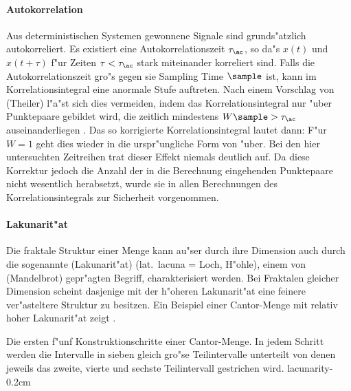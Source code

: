 \paragraph{Autokorrelation}
\label{corrdimtheiler}
Aus deterministischen Systemen gewonnene Signale sind grunds"atzlich autokorreliert. Es
existiert eine Autokorrelationszeit $\tau_\ac$, so da"s 
$x(t)$ und $x(t+\tau)$ f"ur Zeiten $\tau<\tau_\ac$ stark miteinander korreliert sind. Falls die Autokorrelationszeit gro"s 
gegen sie Sampling Time $\sample$ ist, kann im Korrelationsintegral eine anormale Stufe
auftreten. Nach einem Vorschlag von \autor(Theiler) l"a"st sich dies vermeiden, indem das
Korrelationsintegral nur "uber Punktepaare  gebildet wird, die zeitlich mindestens
$W\sample>\tau_\ac$ auseinanderliegen \cite{Theiler}. Das so korrigierte Korrelationsintegral lautet dann:
F"ur $W=1$ geht dies wieder in die urspr"ungliche Form von  "uber. Bei
den hier untersuchten Zeitreihen trat dieser Effekt niemals deutlich auf. Da diese
Korrektur jedoch die Anzahl der in die Berechnung eingehenden Punktepaare nicht
wesentlich herabsetzt, wurde sie in allen Berechnungen des Korrelationsintegrals zur
Sicherheit vorgenommen.

\paragraph{Lakunarit"at}
Die fraktale Struktur einer Menge kann au"ser durch ihre Dimension auch
durch die sogenannte \begriff(Lakunarit"at) (lat.\ lacuna = Loch, H"ohle), einem von
\autor(Mandelbrot) \cite{Mandelbrot82} gepr"agten Begriff, charakterisiert werden.  Bei
Fraktalen gleicher Dimension scheint dasjenige mit der h"oheren Lakunarit"at eine feinere
ver"asteltere Struktur zu besitzen.  Ein Beispiel einer Cantor-Menge
mit relativ hoher Lakunarit"at zeigt .

{Die ersten f"unf Konstruktionschritte einer Cantor-Menge. In jedem Schritt werden die
Intervalle in sieben gleich gro"se Teilintervalle unterteilt von denen jeweils
das zweite, vierte und sechste Teilintervall gestrichen wird. 
}{lacunarity}{-0.2cm}

